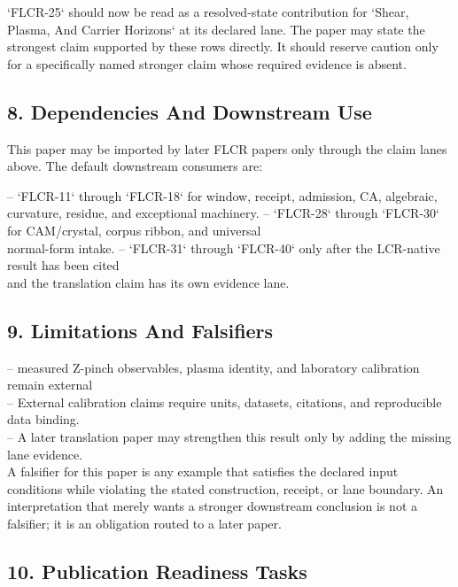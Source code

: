 \documentclass[11pt]{article}
\begin{document}
`FLCR-25` should now be read as a resolved-state contribution for `Shear, Plasma, And Carrier Horizons` at its declared lane. The paper may state the strongest claim supported by these rows directly. It should reserve caution only for a specifically named stronger claim whose required evidence is absent.

\subsection*{8. Dependencies And Downstream Use}

This paper may be imported by later FLCR papers only through the claim lanes
above. The default downstream consumers are:

\noindent{}-- `FLCR-11` through `FLCR-18` for window, receipt, admission, CA, algebraic,\\
  curvature, residue, and exceptional machinery.
\noindent{}-- `FLCR-28` through `FLCR-30` for CAM/crystal, corpus ribbon, and universal\\
  normal-form intake.
\noindent{}-- `FLCR-31` through `FLCR-40` only after the LCR-native result has been cited\\
  and the translation claim has its own evidence lane.

\subsection*{9. Limitations And Falsifiers}

\noindent{}-- measured Z-pinch observables, plasma identity, and laboratory calibration remain external\\
\noindent{}-- External calibration claims require units, datasets, citations, and reproducible data binding.\\
\noindent{}-- A later translation paper may strengthen this result only by adding the missing lane evidence.\\

A falsifier for this paper is any example that satisfies the declared input
conditions while violating the stated construction, receipt, or lane boundary.
An interpretation that merely wants a stronger downstream conclusion is not a
falsifier; it is an obligation routed to a later paper.

\subsection*{10. Publication Readiness Tasks}
\end{document}
